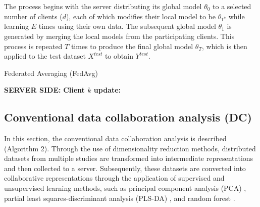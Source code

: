 \documentclass{article}
\begin{document}
The process begins with the server distributing its global model $\theta_{0}$ to a selected number of clients ($d$), each of which modifies their local model to be $\theta_{1^k}$ while learning $E$ times using their own data. The subsequent global model $\theta_{1}$ is generated by merging the local models from the participating clients. This process is repeated $T$ times to produce the final global model $\theta_{T}$, which is then applied to the test dataset $X^{test}$ to obtain $Y^{test}$.

\begin{algorithm}
  \caption{Federated Averaging (FedAvg) \cite{mcmahan2017communication}}
  \label{alg:hoge}
  \begin{algorithmic}[1]
    \State \textbf{SERVER SIDE:}
        \EndFor
    \EndFor
    \State \textbf{Client $k$ update:}
        \EndFor
    \EndFor
  \end{algorithmic}
\end{algorithm}

\subsection{Conventional data collaboration analysis (DC)}
\label{sec:sample1}
In this section, the conventional data collaboration analysis is described (Algorithm 2). Through the use of dimensionality reduction methods, distributed datasets from multiple studies are transformed into intermediate representations and then collected to a server. Subsequently, these datasets are converted into collaborative representations through the application of supervised and unsupervised learning methods, such as principal component analysis (PCA) \cite{pearson1901liii}, partial least squares-discriminant analysis (PLS-DA) \cite{barker2003partial}, and random forest \cite{breiman2001random}.
\end{document}
